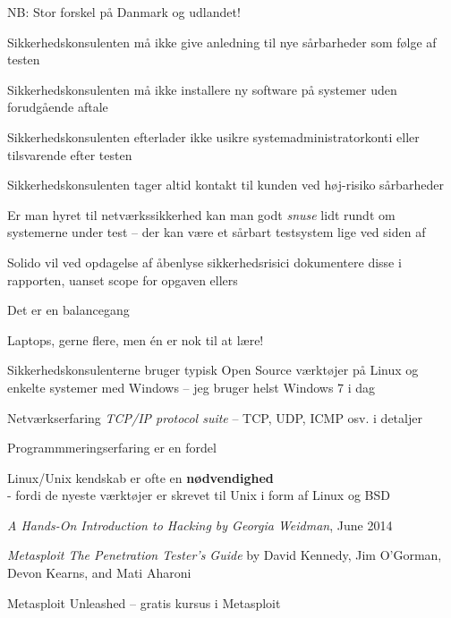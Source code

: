 \documentclass[20pt,landscape,a4paper,footrule]{foils}
\begin{document}
\begin{list2}
\item NB: Stor forskel på Danmark og udlandet!
\item Sikkerhedskonsulenten må ikke give anledning til nye sårbarheder
  som følge af testen
\item Sikkerhedskonsulenten må ikke installere ny software på
  systemer uden forudgående aftale
\item Sikkerhedskonsulenten efterlader ikke usikre
  systemadministratorkonti eller tilsvarende efter testen
\item Sikkerhedskonsulenten tager altid kontakt til kunden ved
  høj-risiko sårbarheder
\item Er man hyret til netværkssikkerhed kan man godt \emph{snuse}
  lidt rundt om systemerne under test -- der kan være et sårbart
  testsystem lige ved siden af
\item Solido vil ved opdagelse af åbenlyse sikkerhedsrisici
  dokumentere disse i rapporten, uanset scope for opgaven ellers
\end{list2}

\centerline{Det er en balancegang}




\begin{list1}

\item Laptops, gerne flere, men én er nok til at lære!
\begin{list2}
\item Sikkerhedskonsulenterne bruger typisk Open Source værktøjer på Linux og
enkelte systemer med Windows -- jeg bruger helst Windows 7 i dag
\item Netværkserfaring \emph{TCP/IP protocol suite} -- TCP, UDP, ICMP osv. i detaljer
\item Programmmeringserfaring er en fordel
\item Linux/Unix kendskab er ofte en {\bfseries nødvendighed}\\
- fordi de nyeste værktøjer er skrevet til Unix i form af Linux og BSD
\item \emph{A Hands-On Introduction to Hacking
by Georgia Weidman}, June 2014\\
\item \emph{Metasploit The Penetration Tester's Guide}
by David Kennedy, Jim O'Gorman, \\
Devon Kearns, and Mati Aharoni 
\item Metasploit Unleashed -- gratis kursus i Metasploit\\
\end{list2}
\end{list1}
\end{document}
